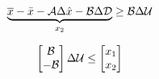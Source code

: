  \begin{equation}
 	\underbrace{\overline{x}-\bar{x}-\CMcal{A}\Delta\hat{x}-\CMcal{B}\Delta\CMcal{D}}_{x_2}\geq \CMcal{B}\Delta\CMcal{U}
 \end{equation}


 \begin{equation}
    	\begin{bmatrix}
	   	\CMcal{B}\\
	   	-\CMcal{B}
	   	\end{bmatrix}
	   	\Delta\CMcal{U}
	   	\leq 
	   	\begin{bmatrix}
 		x_1\\
 		x_2
	   	\end{bmatrix}
 \end{equation}

